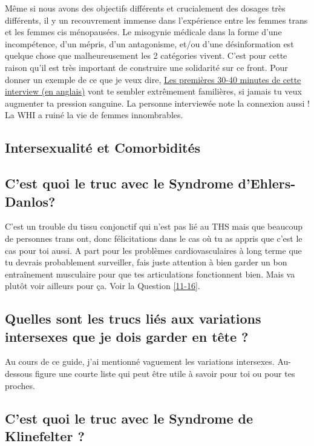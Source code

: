 \documentclass{article}
\begin{document}
Même si nous avons des objectifs différents et crucialement des dosages très différents, il y un recouvrement immense dans l'expérience entre les femmes trans et les femmes cis ménopausées. Le misogynie médicale dans la forme d'une incompétence, d'un mépris, d'un antagonisme, et/ou d'une désinformation est quelque chose que malheureusement les 2 catégories vivent. C'est pour cette raison qu'il est très important de construire une solidarité sur ce front. Pour donner un exemple de ce que je veux dire, \href{https://www.youtube.com/watch?v=W0XW6av2wLQ}{Les premières 30-40 minutes de cette interview (en anglais)} vont te sembler extrêmement familières, si jamais tu veux augmenter ta pression sanguine. La personne interviewée note la connexion aussi ! La WHI a ruiné la vie de femmes innombrables.

\subsection*{Intersexualité et Comorbidités}

\subsection{C'est quoi le truc avec le Syndrome d'Ehlers-Danlos?}

C'est un trouble du tissu conjonctif qui n'est pas lié au THS mais que beaucoup de personnes trans ont, donc félicitations dans le cas où tu as appris que c'est le cas pour toi aussi. A part pour les problèmes cardiovasculaires à long terme que tu devrais probablement surveiller, fais juste attention à bien garder un bon entraînement musculaire pour que tes articulations fonctionnent bien. Mais va plutôt voir ailleurs pour ça. Voir la Question \ref{11-16}.

\subsection{Quelles sont les trucs liés aux variations intersexes que je dois garder en tête ?}

Au cours de ce guide, j'ai mentionné vaguement les variations intersexes. Au-dessous figure une courte liste qui peut être utile à savoir pour toi ou pour tes proches.

\subsection{C'est quoi le truc avec le Syndrome de Klinefelter ?}
\end{document}

